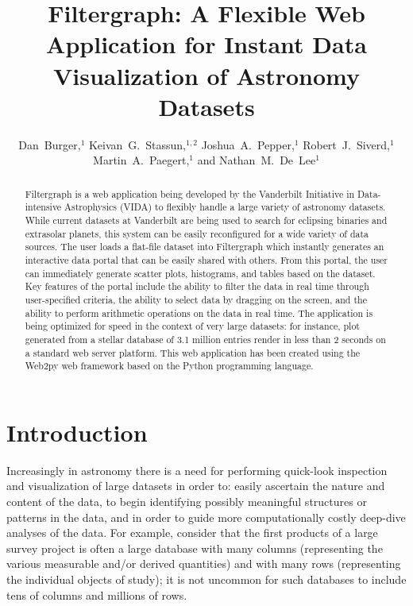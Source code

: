 
\resetcounters




\title{Filtergraph: A Flexible Web Application for Instant Data Visualization of Astronomy Datasets}

\author{Dan~Burger,$^1$ Keivan~G.~Stassun,$^{1,2}$ Joshua~A.~Pepper,$^1$
Robert~J.~Siverd,$^1$ Martin~A.~Paegert,$^1$ and Nathan~M.~De~Lee$^1$
}


\begin{abstract}
Filtergraph is a web application being developed by the Vanderbilt Initiative
in Data-intensive Astrophysics (VIDA) to flexibly handle a large variety
of astronomy datasets. While current datasets at Vanderbilt are being used
to search for eclipsing binaries and extrasolar planets, this system can
be easily reconfigured for a wide variety of data sources. The user loads
a flat-file dataset into Filtergraph which instantly generates an interactive
data portal that can be easily shared with others. From this portal, the user
can immediately generate scatter plots, histograms, and tables based on the
dataset. Key features of the portal include the ability to filter the data
in real time through user-specified criteria, the ability to select data by
dragging on the screen, and the ability to perform arithmetic operations
on the data in real time. The application is being optimized for speed in
the context of very large datasets: for instance, plot generated from a stellar
database of 3.1 million entries render in less than 2 seconds on a
standard web server platform. This web application has been created using
the Web2py web framework based on the Python programming language. 
\end{abstract}

\section{Introduction}
Increasingly in astronomy there is a need for performing quick-look
inspection and visualization of large datasets in order to: easily
ascertain the nature and content of the data, to begin identifying
possibly meaningful structures or patterns in the data, and in order to guide
more computationally costly deep-dive analyses of the data. For example,
consider that the first products of a large survey project is often a
large database with many columns (representing the various measurable
and/or derived quantities) and with many rows (representing the individual
objects of study); it is not uncommon for such databases to include tens
of columns and millions of rows.


